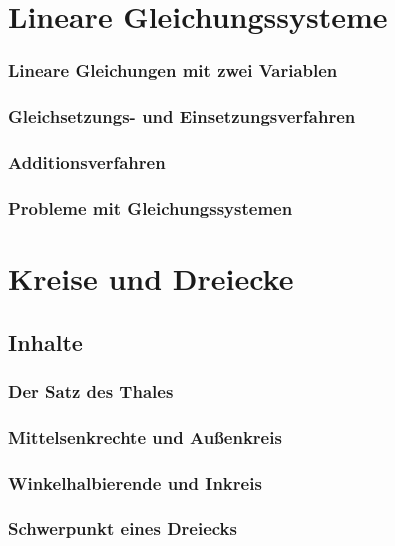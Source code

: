 \documentclass{article}
\begin{document}
\section{Lineare Gleichungssysteme}
\subsubsection*{Lineare Gleichungen mit zwei Variablen}
\subsubsection*{Gleichsetzungs- und Einsetzungsverfahren}
\subsubsection*{Additionsverfahren}
\subsubsection*{Probleme mit Gleichungssystemen}
\newpage

\section{Kreise und Dreiecke}
\subsection{Inhalte}
\subsubsection*{Der Satz des Thales}
\subsubsection*{Mittelsenkrechte und Außenkreis}
\subsubsection*{Winkelhalbierende und Inkreis}
\subsubsection*{Schwerpunkt eines Dreiecks}
\end{document}
